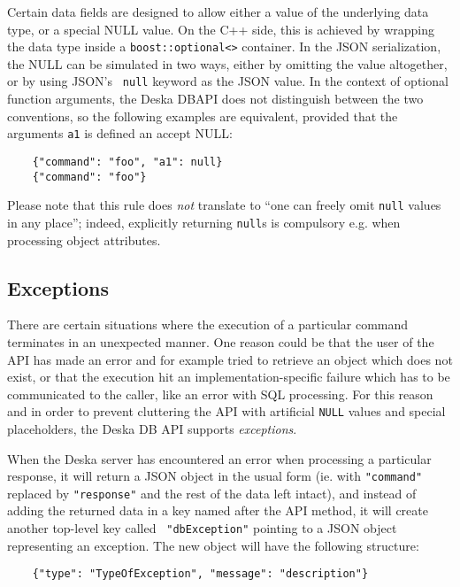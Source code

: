 \documentclass{article}
\begin{document}
Certain data fields are designed to allow either a value of the underlying data type, or a special NULL value.  On the
C++ side, this is achieved by wrapping the data type inside a {\tt boost::optional<>} container.  In the JSON
serialization, the NULL can be simulated in two ways, either by omitting the value altogether, or by using JSON's {\tt
null} keyword as the JSON value.  In the context of optional function arguments, the Deska DBAPI does not distinguish
between the two conventions, so the following examples are equivalent, provided that the arguments {\tt a1} is defined
an accept NULL:

\begin{lstlisting}
    {"command": "foo", "a1": null}
    {"command": "foo"}
\end{lstlisting}

Please note that this rule does {\em not} translate to ``one can freely omit {\tt null} values in any place''; indeed,
explicitly returning {\tt null}s is compulsory e.g. when processing object attributes.

\subsection{Exceptions}

There are certain situations where the execution of a particular command terminates in an unexpected manner.  One reason
could be that the user of the API has made an error and for example tried to retrieve an object which does not exist, or
that the execution hit an implementation-specific failure which has to be communicated to the caller, like an error with
SQL processing.  For this reason and in order to prevent cluttering the API with artificial {\tt NULL} values and
special placeholders, the Deska DB API supports {\em exceptions}.

When the Deska server has encountered an error when processing a particular response, it will return a JSON object in
the usual form (ie. with {\tt "command"} replaced by {\tt "response"} and the rest of the data left intact), and instead
of adding the returned data in a key named after the API method, it will create another top-level key called {\tt
"dbException"} pointing to a JSON object representing an exception.  The new object will have the following structure:

\begin{lstlisting}
    {"type": "TypeOfException", "message": "description"}
\end{lstlisting}
\end{document}
